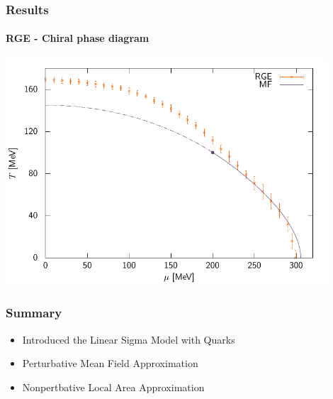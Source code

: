 \documentclass[10pt,a4paper,usenames,dvipsnames]{beamer}
\begin{document}
\begin{frame}
  \frametitle{Results}
  \framesubtitle{RGE - Chiral phase diagram}

  {\centering
    \includegraphics[width=0.9\textwidth]{Plots/rgediag.pdf}
   \par}
\end{frame}

\begin{frame}
  \frametitle{Summary}

  \begin{itemize}
    \item Introduced the Linear Sigma Model with Quarks
    \item Perturbative Mean Field Approximation
    \item Nonpertbative Local Area Approximation
  \end{itemize}

\end{frame}
\end{document}
